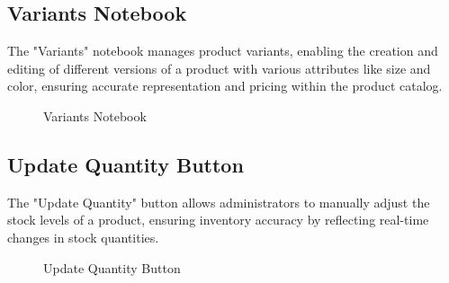 \subsection{Variants Notebook}
The "Variants" notebook manages product variants, enabling the creation and editing of different versions of a product with various attributes like size and color, ensuring accurate representation and pricing within the product catalog.
\begin{figure}[h]
    \centering
    \caption{Variants Notebook}
    \label{fig:variants}
\end{figure}

\subsection{Update Quantity Button}
The "Update Quantity" button allows administrators to manually adjust the stock levels of a product, ensuring inventory accuracy by reflecting real-time changes in stock quantities.
\begin{figure}[h]
    \centering
    \caption{Update Quantity Button}
    \label{fig:update_quantity}
\end{figure}

